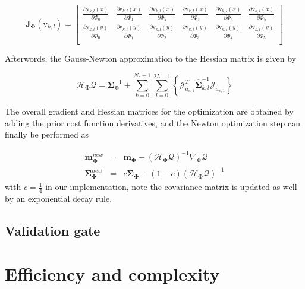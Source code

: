 \begin{equation}
  \label{eq:5.30}
\mathbf{J}_{\mathbf{\Phi}}(\mathrm{v}_{k,l}) =
\left[ {\begin{array}{cccccc}
\frac{\partial \mathrm{v}_{k,l}(x)}{\partial \Phi_0}& \frac{\partial \mathrm{v}_{k,l}(x)}{\partial \Phi_1}& \frac{\partial \mathrm{v}_{k,l}(x)}{\partial \Phi_2}& \frac{\partial \mathrm{v}_{k,l}(x)}{\partial \Phi_3}&\frac{\partial \mathrm{v}_{k,l}(x)}{\partial \Phi_4} &\frac{\partial \mathrm{v}_{k,l}(x)}{\partial \Phi_5}  \\
\frac{\partial \mathrm{v}_{k,l}(y)}{\partial \Phi_0}& \frac{\partial \mathrm{v}_{k,l}(y)}{\partial \Phi_1}& \frac{\partial \mathrm{v}_{k,l}(y)}{\partial \Phi_2}& \frac{\partial \mathrm{v}_{k,l}(y)}{\partial \Phi_3}&\frac{\partial \mathrm{v}_{k,l}(y)}{\partial \Phi_4} &\frac{\partial \mathrm{v}_{k,l}(y)}{\partial \Phi_5}  \\
 \end{array} } \right]
\end{equation}

Afterwords, the Gauss-Newton approximation to the Hessian
matrix is given by

\begin{equation}
  \label{eq:5.31}
  \mathcal{H}_{\mathbf{\Phi}} \mathcal{Q}  =
  \mathbf{\Sigma}_{\mathbf{\Phi}}^{-1} + \sum_{k = 0}^{N_{c}-1}
  \sum_{l=0}^{2L-1} \left\{\mathcal{J}_{a_{v,1}}^T\hat{\mathbf{\Sigma}}_{k,l}^{-1}\mathcal{J}_{a_{v,1}}\right\}
\end{equation}


The overall gradient and Hessian matrices for the optimization
are obtained by adding the prior cost function
derivatives, and the Newton optimization step can finally be
performed as

\begin{eqnarray}
  \mathbf{m}_{\mathbf{\Phi}}^{new} & = &
  \mathbf{m}_{\mathbf{\Phi}} - (\mathcal{H}_{\mathbf{\Phi}}
  \mathcal{Q})^{-1} \nabla_{\mathbf{\Phi}} \mathcal{Q} \nonumber \\
  \mathbf{\Sigma}_{\mathbf{\Phi}}^{new} & = &
  c\mathbf{\Sigma}_{\mathbf{\Phi}} - (1-c)(\mathcal{H}_{\mathbf{\Phi}}
  \mathcal{Q})^{-1}
\end{eqnarray}
with $c = \frac{1}{4}$ in our implementation, note the covariance
matrix is updated as well by an exponential decay rule.

\subsection{Validation gate}
\label{sec:vg}


\section{Efficiency and complexity}
\label{sec:eff}




